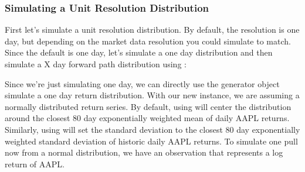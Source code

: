 \documentclass[letterpaper,10pt,english]{sphinxmanual}
\begin{document}
\subsubsection{Simulating a Unit Resolution Distribution}
\label{\detokenize{gettingstarted:simulating-a-unit-resolution-distribution}}
\sphinxAtStartPar
First let’s simulate a unit resolution distribution. By default, the
resolution is one day, but depending on the market data resolution you
could simulate to match. Since the default is one day, let’s simulate a
one day distribution and then simulate a X day forward path distribution
using :

\begin{sphinxVerbatim}[commandchars=\\\{\}]
    
  
\end{sphinxVerbatim}

\sphinxAtStartPar
Since we’re just simulating one day, we can directly use the generator
object simulate a one day return distribution. With our new
 instance, we are assuming a normally
distributed return series. By default, using  will
center the distribution around the closest 80 day exponentially weighted
mean of daily AAPL returns. Similarly, using  will set
the standard deviation to the closest 80 day exponentially weighted
standard deviation of historic daily AAPL returns. To simulate one pull
now from a normal distribution, we have an observation that represents a
log return of AAPL.

\begin{sphinxVerbatim}[commandchars=\\\{\}]
\end{sphinxVerbatim}
\end{document}

